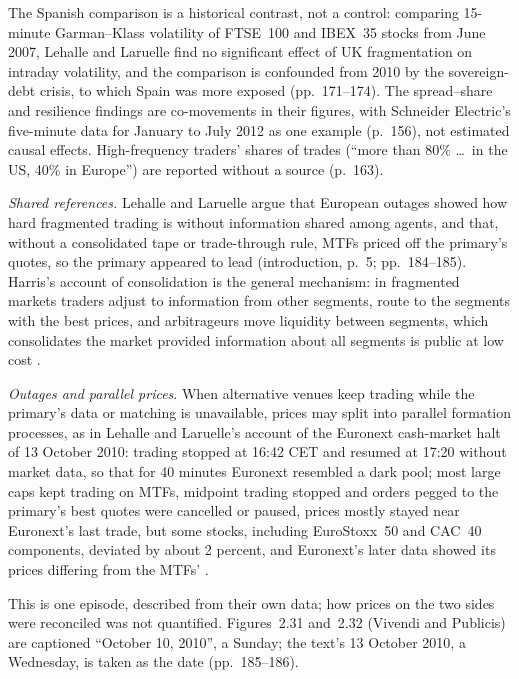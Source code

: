 \begin{qfevidence}
 The Spanish comparison is a historical contrast, not a control: comparing 15-minute Garman--Klass volatility of FTSE~100 and IBEX~35 stocks from June 2007, Lehalle and Laruelle find no significant effect of UK fragmentation on intraday volatility, and the comparison is confounded from 2010 by the sovereign-debt crisis, to which Spain was more exposed (pp.~171--174). The spread--share and resilience findings are co-movements in their figures, with Schneider Electric's five-minute data for January to July 2012 as one example (p.~156), not estimated causal effects. High-frequency traders' shares of trades (``more than 80\% \dots\ in the US, 40\% in Europe'') are reported without a source (p.~163).

 \emph{Shared references.} Lehalle and Laruelle argue that European outages showed how hard fragmented trading is without information shared among agents, and that, without a consolidated tape or trade-through rule, MTFs priced off the primary's quotes, so the primary appeared to lead (introduction, p.~5; pp.~184--185). Harris's account of consolidation is the general mechanism: in fragmented markets traders adjust to information from other segments, route to the segments with the best prices, and arbitrageurs move liquidity between segments, which consolidates the market provided information about all segments is public at low cost \citep[chap.~26, sec.~26.4, pp.~533--534]{alpha-harris}.

\emph{Outages and parallel prices}. When alternative venues keep trading while the primary's data or matching is unavailable, prices may split into parallel formation processes, as in Lehalle and Laruelle's account of the Euronext cash-market halt of 13 October 2010: trading stopped at 16:42 CET and resumed at 17:20 without market data, so that for 40 minutes Euronext resembled a dark pool; most large caps kept trading on MTFs, midpoint trading stopped and orders pegged to the primary's best quotes were cancelled or paused, prices mostly stayed near Euronext's last trade, but some stocks, including EuroStoxx~50 and CAC~40 components, deviated by about 2 percent, and Euronext's later data showed its prices differing from the MTFs' \citep[chap.~2, sec.~2.5.2, pp.~183--185]{alpha-laruelle}.

This is one episode, described from their own data; how prices on the two sides were reconciled was not quantified. Figures~2.31 and~2.32 (Vivendi and Publicis) are captioned ``October 10, 2010'', a Sunday; the text's 13 October 2010, a Wednesday, is taken as the date (pp.~185--186).


\end{qfevidence}
